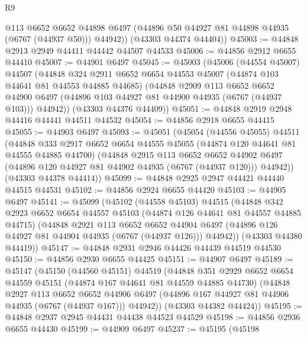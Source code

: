 \begin{lexlean}{R9}
\begin{coremodule}
          @113
          @6652
          @6652
          @44898
          @6497
          (@44896 @50 @44927 @81 @44898 @44935 (@6767 (@44937 @50)))
          @44942))
      (@43303 @44374 @44404))
@45003 := @44848 @2913 @2949 @44411 @44442 @44507 @44533
@45006 := @44856 @2912 @6655 @44410
@45007 := @44901 @6497
@45045 := @45003
    (@45006
      (@44554 @45007)
      @44507
      (@44848
        @324
        @2911
        @6652
        @6654
        @44553
        @45007
        (@44874 @103 @44641 @81 @44553 @44885 @44685)
        (@44848
          @2909
          @113
          @6652
          @6652
          @44900
          @6497
          (@44896 @103 @44927 @81 @44900 @44935 (@6767 (@44937 @103)))
          @44942))
      (@43303 @44376 @44409))
@45051 := @44848 @2919 @2948 @44416 @44441 @44511 @44532
@45054 := @44856 @2918 @6655 @44415
@45055 := @44903 @6497
@45093 := @45051
    (@45054
      (@44556 @45055)
      @44511
      (@44848
        @333
        @2917
        @6652
        @6654
        @44555
        @45055
        (@44874 @120 @44641 @81 @44555 @44885 @44700)
        (@44848
          @2915
          @113
          @6652
          @6652
          @44902
          @6497
          (@44896 @120 @44927 @81 @44902 @44935 (@6767 (@44937 @120)))
          @44942))
      (@43303 @44378 @44414))
@45099 := @44848 @2925 @2947 @44421 @44440 @44515 @44531
@45102 := @44856 @2924 @6655 @44420
@45103 := @44905 @6497
@45141 := @45099
    (@45102
      (@44558 @45103)
      @44515
      (@44848
        @342
        @2923
        @6652
        @6654
        @44557
        @45103
        (@44874 @126 @44641 @81 @44557 @44885 @44715)
        (@44848
          @2921
          @113
          @6652
          @6652
          @44904
          @6497
          (@44896 @126 @44927 @81 @44904 @44935 (@6767 (@44937 @126)))
          @44942))
      (@43303 @44380 @44419))
@45147 := @44848 @2931 @2946 @44426 @44439 @44519 @44530
@45150 := @44856 @2930 @6655 @44425
@45151 := @44907 @6497
@45189 := @45147
    (@45150
      (@44560 @45151)
      @44519
      (@44848
        @351
        @2929
        @6652
        @6654
        @44559
        @45151
        (@44874 @167 @44641 @81 @44559 @44885 @44730)
        (@44848
          @2927
          @113
          @6652
          @6652
          @44906
          @6497
          (@44896 @167 @44927 @81 @44906 @44935 (@6767 (@44937 @167)))
          @44942))
      (@43303 @44382 @44424))
@45195 := @44848 @2937 @2945 @44431 @44438 @44523 @44529
@45198 := @44856 @2936 @6655 @44430
@45199 := @44909 @6497
@45237 := @45195
    (@45198

\end{coremodule}
\end{lexlean}
